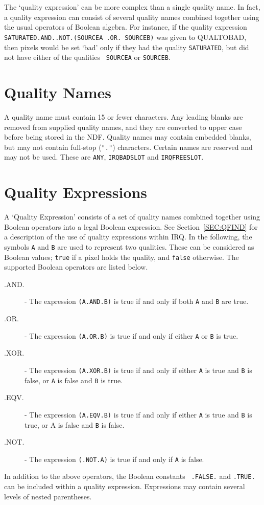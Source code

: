 \documentclass[twoside,11pt]{article}
\newcommand{\htmlref}[2]{#1}
\newcommand{\latexhtml}[2]{#1}
\newcommand{\xlabel}[1]{}
\renewcommand{\_}{\texttt{\symbol{95}}}
\begin{document}
The `quality expression' can be more complex than a single quality
name. In fact, a quality expression can consist of several quality
names combined together using the usual operators of Boolean algebra.
For instance, if the quality expression {\tt
SATURATED.AND..NOT.(SOURCE\_A .OR. SOURCE\_B)} was given to 
QUALTOBAD, then pixels would be set `bad' only if they had the quality
{\tt SATURATED}, but did not have either of the qualities {\tt
SOURCE\_A} or {\tt SOURCE\_B}.

\section{Quality Names}

A quality name must contain 15 or fewer characters. Any leading blanks
are removed from supplied quality names, and they are converted to
upper case before being stored in the NDF. Quality names may contain
embedded blanks, but may not contain full-stop ({\tt "."}) characters.
Certain names are reserved and may not be used. These are {\tt ANY},
{\tt IRQ\_BAD\_SLOT} and {\tt IRQ\_FREE\_SLOT}.

\section{\xlabel{SEC:QEXP}Quality Expressions}
\label{SEC:QEXP}

A `Quality Expression' consists of a set of quality names combined
together using Boolean operators into a legal Boolean expression. See
\latexhtml{Section~\ref{SEC:QFIND}}{\htmlref{this section}{SEC:QFIND}} 
for a description of the use of quality expressions within IRQ. In the
following, the symbols {\tt A} and {\tt B} are used to represent two
qualities. These can be considered as Boolean values; {\tt true} if a
pixel holds the quality, and {\tt false} otherwise. The supported
Boolean operators are listed below.  

\begin {description}
\item [.AND.] - The expression {\tt (A.AND.B)} is true if and only if
both {\tt A} and {\tt B} are true.  
\item [.OR.] - The expression {\tt (A.OR.B)} is true if and only if 
either {\tt A} or {\tt B} is true.
\item [.XOR.] - The
expression {\tt (A.XOR.B)} is true if and only if either {\tt A} is true and {\tt B}
is false, or {\tt A} is false and {\tt B} is true. 
\item [.EQV.] - The expression {\tt (A.EQV.B)} is true if and only if either {\tt A} 
is true and {\tt B} is true, or A is false and {\tt B} is false.
\item [.NOT.] - The expression {\tt (.NOT.A)} is true if and only if {\tt A} is 
false. 
\end{description} 
In addition to the above operators, the Boolean constants {\tt
.FALSE.} and {\tt .TRUE.} can be included within a quality expression.
Expressions may contain several levels of nested parentheses. 
\end{document}
